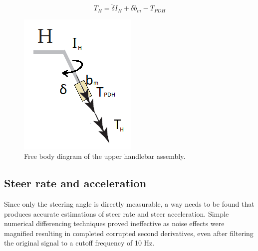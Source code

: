 \begin{equation}
    T_{H}= \ddot{\delta}I_H+\dot{\delta}b_{m} -T_{PDH} 
    \label{eq:torque_rider}
\end{equation}
\begin{figure}[h]
    \centering 
    \captionsetup{justification=centering,margin=2cm}

    \captionsetup{justification=centering,margin=2cm}
    \includegraphics[scale=0.9]{images/free_handle.png}
    \caption[Short title]{Free body diagram of the upper handlebar assembly. }
    \label{fig:free_handle}
\end{figure}

\subsection{Steer rate and acceleration} \label{sec:rateAccel}
Since only the steering angle is directly measurable, a way needs to be found that produces accurate estimations of steer rate and steer acceleration. Simple numerical differencing techniques proved ineffective as noise effects were magnified resulting in completed corrupted second derivatives, even after filtering the original signal to a cutoff frequency of 10 Hz. 

